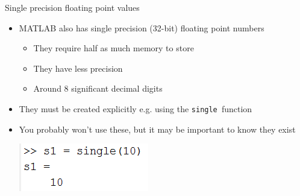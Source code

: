 \documentclass{beamer}
\begin{document}

\begin{frame}{Single precision floating point values}
	\begin{itemize}
		\item MATLAB also has single precision (32-bit) floating point numbers
		\begin{itemize}
			\item They require half as much memory to store
			\item They have less precision
			\item Around 8 significant decimal digits
		\end{itemize}
		\item They must be created explicitly e.g. using the \texttt{single }function
		 \item You probably won't use these, but it may be important to know they exist
		 
		 \includegraphics[scale=0.7]{single}
	\end{itemize}
\end{frame}
\end{document}
